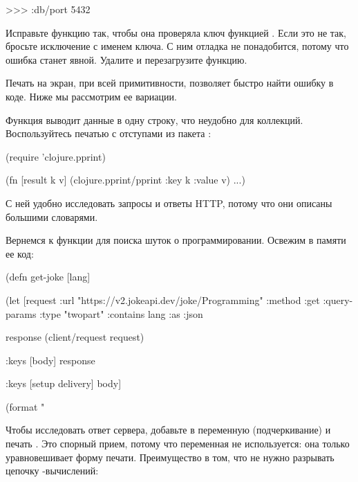 \begin{english}
  \begin{text}
>>>  :db/port 5432
  \end{text}
\end{english}


Исправьте функцию так, чтобы она проверяла ключ функцией . Если это не так, бросьте исключение с именем ключа. С ним отладка не понадобится, потому что ошибка станет явной. Удалите  и перезагрузите функцию.

Печать на экран, при всей примитивности, позволяет быстро найти ошибку в коде. Ниже мы рассмотрим ее вариации.

Функция  выводит данные в одну строку, что неудобно для коллекций. Воспользуйтесь печатью с отступами из пакета :

\begin{english}
  \begin{clojure}
(require 'clojure.pprint)

(fn [result k v]
  (clojure.pprint/pprint
    {:key k :value v})
  ...)
  \end{clojure}
\end{english}

С ней удобно исследовать запросы и ответы HTTP, потому что они описаны большими словарями.

Вернемся к функции  для поиска шуток о программировании. Освежим в памяти ее код:

\begin{english}
  \begin{clojure}
(defn get-joke [lang]

  (let [request
        {:url "https://v2.jokeapi.dev/joke/Programming"
         :method :get
         :query-params {:type "twopart" :contains lang}
         :as :json}

        response
        (client/request request)

        {:keys [body]}
        response

        {:keys [setup delivery]}
        body]

    (format "%
  \end{clojure}
\end{english}

Чтобы исследовать ответ сервера, добавьте в  переменную \code{\_} (подчеркивание) и печать  . Это спорный прием, потому что переменная \code{\_} не используется: она только уравновешивает форму печати. Преимущество в том, что не нужно разрывать цепочку -вычислений:

